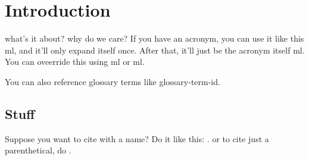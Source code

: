 \chapter{Introduction}\label{ch:introduction}
what's it about? why do we care?
If you have an acronym, you can use it like this \gls{ml}, and it'll only
expand itself once. After that, it'll just be the acronym itself \gls{ml}.
You can oveerride this using \acrfull{ml} or \acrlong{ml}.

You can also reference glossary terms like \gls{glossary-term-id}.

\section{Stuff}
Suppose you want to cite with a name? Do it like this: \citet{russellArtificialIntelligenceModern2010}.
or to cite just a parenthetical, do \citep{russellArtificialIntelligenceModern2010}.